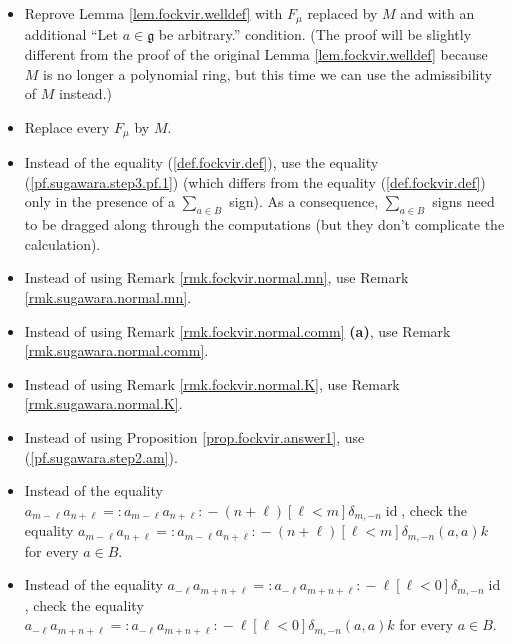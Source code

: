 \documentclass[etingof-lie.tex]{subfiles}
\begin{document}
\begin{itemize}
\item Reprove Lemma \ref{lem.fockvir.welldef} with $F_{\mu}$ replaced by $M$
and with an additional ``Let $a\in\mathfrak{g}$ be arbitrary.'' condition.
(The proof will be slightly different from the proof of the original Lemma
\ref{lem.fockvir.welldef} because $M$ is no longer a polynomial ring, but this
time we can use the admissibility of $M$ instead.)

\item Replace every $F_{\mu}$ by $M$.

\item Instead of the equality (\ref{def.fockvir.def}), use the equality
(\ref{pf.sugawara.step3.pf.1}) (which differs from the equality
(\ref{def.fockvir.def}) only in the presence of a $\sum\limits_{a\in B}$
sign). As a consequence, $\sum\limits_{a\in B}$ signs need to be dragged along
through the computations (but they don't complicate the calculation).

\item Instead of using Remark \ref{rmk.fockvir.normal.mn}, use Remark
\ref{rmk.sugawara.normal.mn}.

\item Instead of using Remark \ref{rmk.fockvir.normal.comm} \textbf{(a)}, use
Remark \ref{rmk.sugawara.normal.comm}.

\item Instead of using Remark \ref{rmk.fockvir.normal.K}, use Remark
\ref{rmk.sugawara.normal.K}.

\item Instead of using Proposition \ref{prop.fockvir.answer1}, use
(\ref{pf.sugawara.step2.am}).

\item Instead of the equality $a_{m-\ell}a_{n+\ell}=\left.  :a_{m-\ell
}a_{n+\ell}:\right.  -\left(  n+\ell\right)  \left[  \ell<m\right]
\delta_{m,-n}\operatorname*{id}$, check the equality $a_{m-\ell}a_{n+\ell
}=\left.  :a_{m-\ell}a_{n+\ell}:\right.  -\left(  n+\ell\right)  \left[
\ell<m\right]  \delta_{m,-n}\left(  a,a\right)  k$ for every $a\in B$.

\item Instead of the equality $a_{-\ell}a_{m+n+\ell}=\left.  :a_{-\ell
}a_{m+n+\ell}:\right.  -\ell\left[  \ell<0\right]  \delta_{m,-n}%
\operatorname*{id}$, check the equality $a_{-\ell}a_{m+n+\ell}=\left.
:a_{-\ell}a_{m+n+\ell}:\right.  -\ell\left[  \ell<0\right]  \delta
_{m,-n}\left(  a,a\right)  k$ for every $a\in B$.
\end{itemize}
\end{document}
